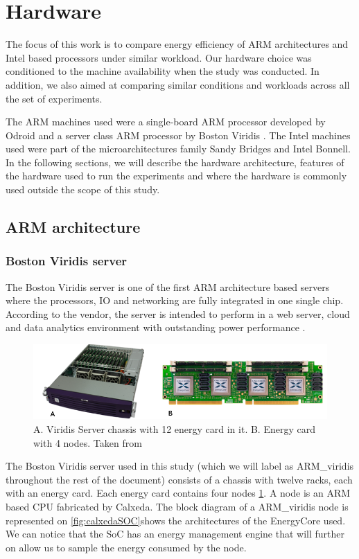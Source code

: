 \section{Hardware}
The focus of this work is to compare energy efficiency of ARM architectures and Intel based 
processors under similar workload. Our hardware choice  was conditioned to the
machine availability when the study was conducted. In addition, we also aimed
at comparing similar conditions and workloads across all the set of experiments. 

The ARM machines used were a single-board ARM processor developed by Odroid
\cite{ODROID_XU3} and a server class ARM processor by Boston 
Viridis \cite{VIRIDIS}. The Intel machines used were part of the microarchitectures family Sandy Bridges and Intel Bonnell. In the following sections, we will describe the hardware architecture, features of the hardware used to run the experiments and where the hardware is commonly used outside the scope of this study. 

\subsection{ARM architecture}
\subsubsection*{Boston Viridis server}

The Boston Viridis server is one of the first ARM architecture based servers
where the processors, IO and networking are fully integrated in one single chip.
According to the vendor, the server is intended to perform in a web server,
cloud and data analytics environment with outstanding power performance \cite{VIRIDIS}.

\begin{figure}[h!]
  \centering
    \includegraphics[width=\textwidth]{"img/viridis&SoC"}
    \caption{A. Viridis Server chassis with 12 energy card in it. B. Energy card
with 4 nodes. Taken from \cite{VIRIDIS}}
    \label{fig:viridis&SoC}
\end{figure}


The Boston Viridis server used in this study (which we will label as ARM\_viridis throughout the rest of the document) consists of a chassis with twelve racks, each with an
energy card. Each energy card contains four nodes \ref{fig:viridis&SoC}. 
A node is an ARM based CPU fabricated by Calxeda. The block diagram of a ARM\_viridis node is represented on \ref{fig:calxedaSOC}shows the architectures of the EnergyCore used. We can notice that the SoC has an energy management engine that will further on allow us to sample the energy consumed by the node.  

